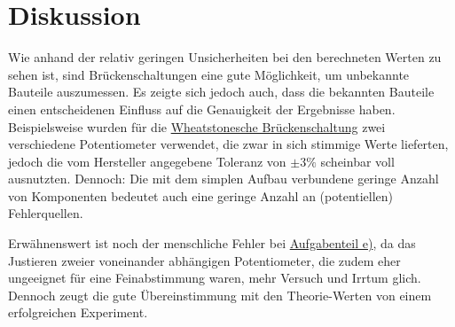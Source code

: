 \section{Diskussion} \label{sec:Diskussion}

Wie anhand der relativ geringen Unsicherheiten bei den berechneten Werten zu sehen ist, sind Brückenschaltungen eine gute Möglichkeit, um unbekannte Bauteile auszumessen.
Es zeigte sich jedoch auch, dass die bekannten Bauteile einen entscheidenen Einfluss auf die Genauigkeit der Ergebnisse haben.
Beispielsweise wurden für die \hyperref[sec:AufgabeA]{Wheatstonesche Brückenschaltung} zwei verschiedene Potentiometer verwendet, die zwar in sich stimmige Werte lieferten, jedoch die vom Hersteller angegebene Toleranz von $\pm 3\%$ scheinbar voll ausnutzten.
Dennoch: Die mit dem simplen Aufbau verbundene geringe Anzahl von Komponenten bedeutet auch eine geringe Anzahl an (potentiellen) Fehlerquellen.

Erwähnenswert ist noch der menschliche Fehler bei \hyperref[sec:AufgabeE]{Aufgabenteil e)}, da das Justieren zweier voneinander abhängigen Potentiometer, die zudem eher ungeeignet für eine Feinabstimmung waren, mehr Versuch und Irrtum glich. Dennoch zeugt die gute Übereinstimmung mit den Theorie-Werten von einem erfolgreichen Experiment.
